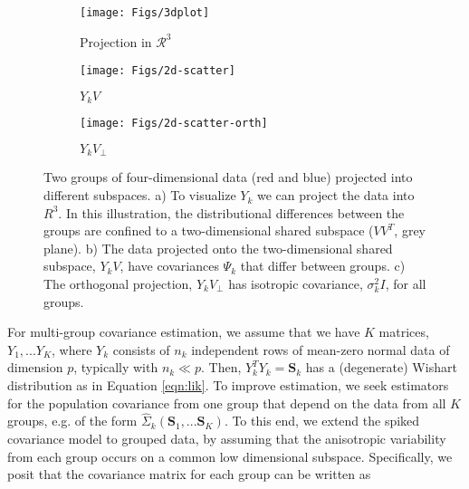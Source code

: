 \documentclass[12pt]{article}
\newcommand{\bl}[1]{{\mathbf #1}}
\begin{document}
\begin{figure}[t]
    \centering
    \begin{subfigure}[b]{0.25\textwidth}
        \texttt{[image: Figs/3dplot]}
        \caption{Projection in $\mathcal{R}^3$}
        \label{fig:dmelanRatio}
    \end{subfigure}
\quad
    \begin{subfigure}[b]{0.25\textwidth}
        \texttt{[image: Figs/2d-scatter]}
        \caption{$Y_kV$}
        \label{fig:dmelanPosterior}
    \end{subfigure}
\quad 
    \begin{subfigure}[b]{0.25\textwidth}
        \texttt{[image: Figs/2d-scatter-orth]}
        \caption{$Y_kV_{\perp}$}
        \label{fig:dmelanPosterior}
    \end{subfigure}
    \caption{ Two groups of four-dimensional data (red and blue)
      projected into different subspaces.  a) To visualize $Y_k$ we
      can project the data into $R^3$.  In this illustration, the
      distributional differences between the groups are confined to a
      two-dimensional shared subspace ($VV^T$, grey plane).  b) The
      data projected onto the two-dimensional shared subspace,
      $Y_kV$, have covariances $\Psi_k$ that differ between
      groups. c) The orthogonal projection, $Y_kV_{\perp}$
      has isotropic covariance, $\sigma_k^2I$, for all groups.  }
\label{fig:shared}
\end{figure}

For multi-group covariance estimation, we assume that we have $K$
matrices, $Y_1, ... Y_K$, where $Y_k$ consists
of $n_k$ independent rows of mean-zero normal data of dimension $p$,
typically with $n_k \ll p$.  Then, $Y_k^TY_k = \bl S_k$ has a
(degenerate) Wishart distribution as in Equation \ref{eqn:lik}.  To
improve estimation, we seek estimators for the population covariance
from one group that depend on the data from all $K$ groups, e.g. of
the form $\hat \Sigma_k(\bl S_1, ... \bl S_K)$.  To this end, we
extend the spiked covariance model to grouped data, by assuming that
the anisotropic variability from each group occurs on a common low
dimensional subspace.  Specifically, we posit that the covariance
matrix for each group can be written as
\end{document}
